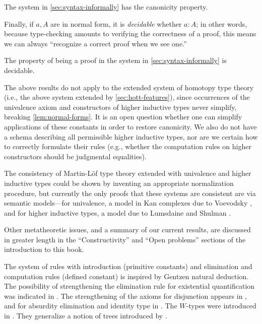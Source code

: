 \begin{cor}
 The system in \autoref{sec:syntax-informally} has the canonicity property.
\end{cor}

Finally, if $a,A$ are in normal form, it is \emph{decidable} whether $a:A$; in
other words, because type-checking amounts to verifying the correctness of a
proof, this means we can always ``recognize a correct proof when we see one.''

\begin{cor}
The property of being a proof in the system in \autoref{sec:syntax-informally} is decidable.
\end{cor}

\mentalpause

The above results do not apply to the extended system of homotopy type
theory (i.e., the above system extended by \autoref{sec:hott-features}), since
occurrences of the univalence axiom and constructors of higher inductive types
never simplify, breaking \autoref{lem:normal-forms}. It is an open question
whether one can simplify applications of these constants in order to restore
canonicity. We also do not have a schema describing all permissible higher
inductive types, nor are we certain how to correctly formulate their rules
(e.g., whether the computation rules on higher constructors should be judgmental
equalities).

The consistency of Martin-L\"{o}f type theory extended with univalence and higher
inductive types could be shown by inventing an appropriate normalization procedure, but currently
the only proofs that these systems are consistent are via semantic models---for
univalence, a model in Kan complexes due to Voevodsky \cite{klv:ssetmodel}, and
for higher inductive types, a model due to Lumsdaine and Shulman \cite{ls:hits}.

Other metatheoretic issues, and a summary of our current results, are discussed
in greater length in the ``Constructivity'' and ``Open problems'' sections of
the introduction to this book.

%

\sectionNotes\label{subsec:general-remarks}


The system of rules with introduction (primitive constants) and elimination
and computation rules (defined constant) is inspired by Gentzen natural
deduction. The possibility of strengthening the elimination rule for
existential quantification was indicated in \cite{howard:pat}. The
strengthening of the axioms for disjunction appears in \cite{Martin-Lof-1972},
and for absurdity elimination and identity type in \cite{Martin-Lof-1973}. The
$W$-types were introduced in \cite{Martin-Lof-1979}. They generalize a notion
of trees introduced by \cite{Tait-1968}.

